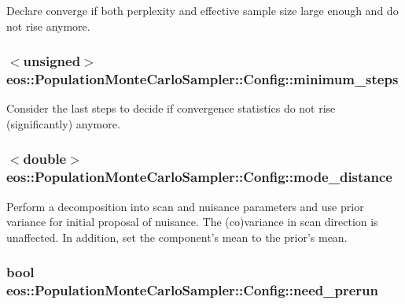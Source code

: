 Declare converge if both perplexity and effective sample size large enough and do not rise anymore. \hypertarget{structeos_1_1PopulationMonteCarloSampler_1_1Config_ac7a03e69442b543fc2cacaa647988741}{
\subsubsection[{minimum\_\-steps}]{$<$unsigned$>$ {\bf eos::PopulationMonteCarloSampler::Config::minimum\_\-steps}}}
\label{structeos_1_1PopulationMonteCarloSampler_1_1Config_ac7a03e69442b543fc2cacaa647988741}


Consider the last steps to decide if convergence statistics do not rise (significantly) anymore. \hypertarget{structeos_1_1PopulationMonteCarloSampler_1_1Config_abb5d4e207d1f2da439dddf9c49854a1e}{
\subsubsection[{mode\_\-distance}]{$<$double$>$ {\bf eos::PopulationMonteCarloSampler::Config::mode\_\-distance}}}
\label{structeos_1_1PopulationMonteCarloSampler_1_1Config_abb5d4e207d1f2da439dddf9c49854a1e}
Perform a decomposition into scan and nuisance parameters and use prior variance for initial proposal of nuisance. The (co)variance in scan direction is unaffected. In addition, set the component's mean to the prior's mean. \hypertarget{structeos_1_1PopulationMonteCarloSampler_1_1Config_ac729d374ca2a58aeba6cf60d296d7720}{
\subsubsection[{need\_\-prerun}]{\setlength{\rightskip}{0pt plus 5cm}bool {\bf eos::PopulationMonteCarloSampler::Config::need\_\-prerun}}}
\label{structeos_1_1PopulationMonteCarloSampler_1_1Config_ac729d374ca2a58aeba6cf60d296d7720}


